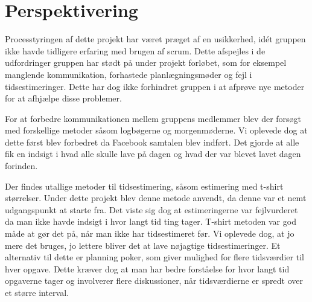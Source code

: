 \chapter{Perspektivering}
Processtyringen af dette projekt har været præget af en usikkerhed, idét gruppen ikke havde tidligere erfaring med brugen af scrum. Dette afspejles i de udfordringer gruppen har stødt på under projekt forløbet, som for eksempel manglende kommunikation, forhastede planlægningsmøder og fejl i tidsestimeringer. Dette har dog ikke forhindret gruppen i at afprøve nye metoder for at afhjælpe disse problemer. \newline

\noindent For at forbedre kommunikationen mellem gruppens medlemmer blev der forsøgt med forskellige metoder såsom logbøgerne og morgenmøderne. Vi oplevede dog at dette først blev forbedret da Facebook samtalen blev indført. Det gjorde at alle fik en indsigt i hvad alle skulle lave på dagen og hvad der var blevet lavet dagen forinden. \newline

\noindent Der findes utallige metoder til tidsestimering, såsom estimering med t-shirt størrelser. Under dette projekt blev denne metode anvendt, da denne var et nemt udgangspunkt at starte fra. Det viste sig dog at estimeringerne var fejlvurderet da man ikke havde indsigt i hvor langt tid ting tager. T-shirt metoden var god måde at gør det på, når man ikke har tidsestimeret før. Vi oplevede dog, at jo mere det bruges, jo lettere bliver det at lave nøjagtige tidsestimeringer. Et alternativ til dette er planning poker, som giver mulighed for flere tidsværdier til hver opgave. Dette kræver dog at man har bedre forståelse for hvor langt tid opgaverne tager og involverer flere diskussioner, når tidsværdierne er spredt over et større interval.

